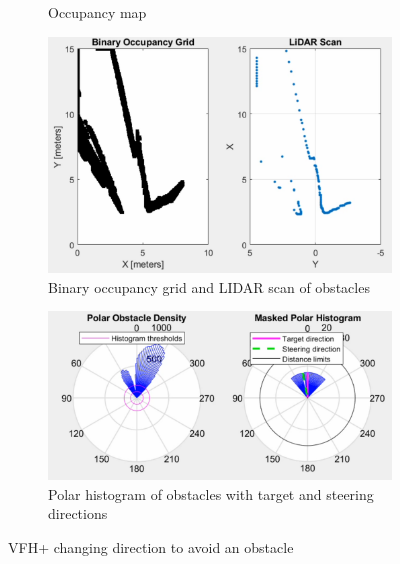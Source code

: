 \begin{figure}[b]
\begin{subfigure}{.3\textwidth}
        \caption{Occupancy map}
    \end{subfigure}
    \begin{subfigure}{.45\textwidth}
        \centering
        \includegraphics[width=\linewidth]{images/vfh_example_lidar.PNG}
        \caption{Binary occupancy grid and LIDAR scan of obstacles}
    \end{subfigure}
    \quad
    \begin{subfigure}{.45\textwidth}
        \centering
        \includegraphics[width=\linewidth]{images/vfh_example_hist.PNG}
        \caption{Polar histogram of obstacles with target and steering directions}
    \end{subfigure}
    \caption{VFH+ changing direction to avoid an obstacle}
    \label{fig:vfh_implementation}
\end{figure}


